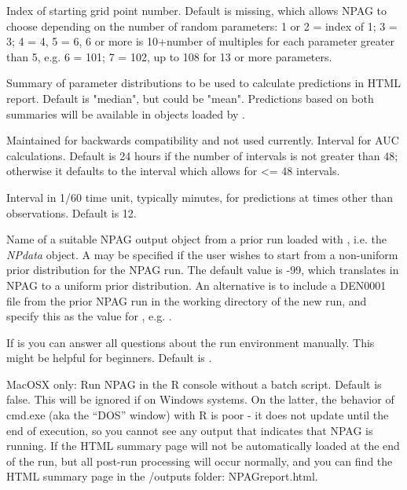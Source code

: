 \documentclass[a4paper]{book}
\begin{document}
\begin{Arguments}
\begin{ldescription}
\item[\code{indpts}] Index of starting grid point number.  Default is missing, which allows NPAG to choose depending on the number of random parameters: 
1 or 2 = index of 1; 3 = 3; 4 = 4, 5 = 6,
6 or more is 10+number of multiples for each parameter greater than 5, e.g. 6 = 101; 7 = 102, up to 108 for 13 or more parameters.

\item[\code{icen}] Summary of parameter distributions to be used to calculate predictions in HTML report.  Default is "median", but could be "mean".
Predictions based on both summaries will be available in objects loaded by .

\item[\code{aucint}] Maintained for backwards compatibility and not used currently. Interval for AUC calculations.  Default is 24 hours if the number of intervals is not greater than 48; otherwise it defaults
to the interval which allows for <= 48 intervals.

\item[\code{idelta}] Interval in 1/60 time unit, typically minutes, for predictions at times other than observations.  Default is 12.

\item[\code{prior}] Name of a suitable NPAG output object from a prior run loaded with ,
i.e. the \emph{NPdata} object.  A  may be specified if the user wishes to
start from a non-uniform prior distribution for the NPAG run. The default value is -99,
which translates in NPAG to a uniform prior distribution.  An alternative is to include a DEN0001 file from the prior
NPAG run in the working directory of the new run, and specify this as the value for , e.g.
.

\item[\code{auto}] If  is  you can answer all questions about the run environment manually.  This might
be helpful for beginners.  Default is .

\item[\code{intern}] MacOSX only: Run NPAG in the R console without a batch script.  Default is false.
This will be ignored if on Windows systems.  On the latter, the behavior of cmd.exe (aka the ``DOS'' window)
with R is poor - it does not update until the end of execution, so you cannot see any output that indicates that NPAG is running.  
If  the HTML summary page will not be automatically loaded at the end of the run, but all post-run processing will occur normally,
and you can find the HTML summary page in the /outputs folder: NPAGreport.html.


\end{ldescription}
\end{Arguments}
\end{document}

